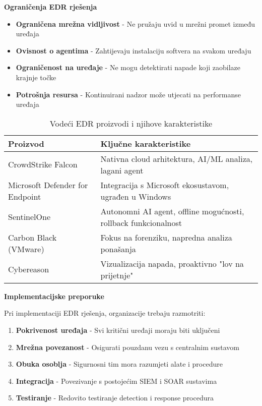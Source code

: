 \textbf{Ograničenja EDR rješenja}

\begin{itemize}
\item \textbf{Ograničena mrežna vidljivost} - Ne pružaju uvid u mrežni promet između uređaja
\item \textbf{Ovisnost o agentima} - Zahtijevaju instalaciju softvera na svakom uređaju
\item \textbf{Ograničenost na uređaje} - Ne mogu detektirati napade koji zaobilaze krajnje točke
\item \textbf{Potrošnja resursa} - Kontinuirani nadzor može utjecati na performanse uređaja
\end{itemize}

\begin{table}[h]
\centering
\begin{tabular}{|l|p{8cm}|}
\hline
\textbf{Proizvod} & \textbf{Ključne karakteristike} \\
\hline
CrowdStrike Falcon & Nativna cloud arhitektura, AI/ML analiza, lagani agent \\
\hline
Microsoft Defender for Endpoint & Integracija s Microsoft ekosustavom, ugrađen u Windows \\
\hline
SentinelOne & Autonomni AI agent, offline mogućnosti, rollback funkcionalnost \\
\hline
Carbon Black (VMware) & Fokus na forenziku, napredna analiza ponašanja \\
\hline
Cybereason & Vizualizacija napada, proaktivno "lov na prijetnje" \\
\hline
\end{tabular}
\caption{Vodeći EDR proizvodi i njihove karakteristike}
\end{table}

\textbf{Implementacijske preporuke}

Pri implementaciji EDR rješenja, organizacije trebaju razmotriti:

\begin{enumerate}
\item \textbf{Pokrivenost uređaja} - Svi kritični uređaji moraju biti uključeni
\item \textbf{Mrežna povezanost} - Osigurati pouzdanu vezu s centralnim sustavom
\item \textbf{Obuka osoblja} - Sigurnosni tim mora razumjeti alate i procedure
\item \textbf{Integracija} - Povezivanje s postojećim SIEM i SOAR sustavima
\item \textbf{Testiranje} - Redovito testiranje detection i response procedura
\end{enumerate}